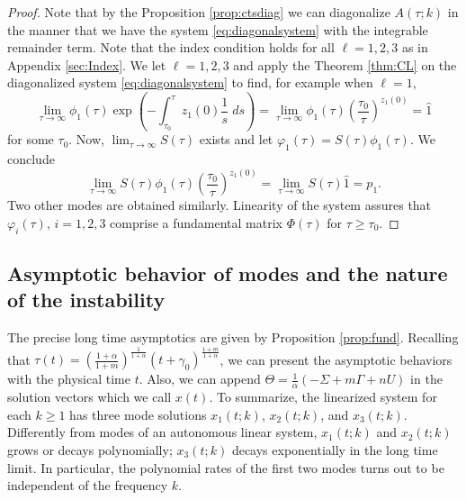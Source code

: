 \documentclass[a4paper,11pt]{article}
\theoremstyle{remark}
\begin{document}
\begin{proof}
Note that by the Proposition \ref{prop:ctsdiag} we can diagonalize $A(\tau;k)$ in the manner that we have the system \eqref{eq:diagonalsystem} with the integrable remainder term. Note that the index condition holds for all $\ell=1,2,3$ as in Appendix \ref{sec:Index}. We let $\ell=1,2,3$ and apply the Theorem \ref{thm:CL} on the diagonalized system \eqref{eq:diagonalsystem} to find, for example when $\ell=1$,
$$ \lim_{\tau \rightarrow \infty} \phi_1(\tau)\exp\left(-\int_{\tau_0}^\tau z_1(0)\frac{1}{s}\; ds\right) = \lim_{\tau \rightarrow \infty} \phi_1(\tau)\left(\frac{\tau_0}{\tau}\right)^{z_1(0)} = \hat{1}$$
for some $\tau_0$. Now, $\displaystyle\lim_{\tau \rightarrow \infty} S(\tau)$ exists and let $\varphi_1(\tau) = S(\tau)\phi_1(\tau)$. We conclude
$$ \lim_{\tau \rightarrow \infty} S(\tau)\phi_1(\tau)\left(\frac{\tau_0}{\tau}\right)^{z_1(0)} = \lim_{\tau \rightarrow \infty}S(\tau)\hat{1} = p_1.$$%
Two other modes are obtained similarly. Linearity of the system assures that $\varphi_i(\tau)$, $i=1,2,3$ comprise a fundamental matrix $\Phi(\tau)$ for $\tau\ge\tau_0$.
\end{proof}


\subsection{Asymptotic behavior of modes and the nature of the instability}
The precise long time asymptotics are given by Proposition \ref{prop:fund}.  Recalling that $\tau(t) = \left(\frac{1+\alpha}{1+m}\right)^{\frac{1}{1+\alpha}} (t + \gamma_0)^{\frac{1+m}{1+\alpha}}$, we can present the asymptotic behaviors with the physical time $t$. Also, we can append $\Theta = \frac{1}{\alpha}(-\Sigma + m\Gamma +n U)$ in the solution vectors which we call $x(t)$. To summarize, the linearized system for each $k\ge1$ has three  mode solutions $x_1(t;k)$, $x_2(t;k)$, and $x_3(t;k)$. Differently from modes of an autonomous linear system, $x_1(t;k)$ and $x_2(t;k)$ grows or decays polynomially; $x_3(t;k)$ decays exponentially in the long time limit. In particular, the polynomial rates of the first two modes turns out to be independent of the frequency $k$. %
\end{document}
